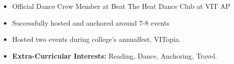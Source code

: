 \begin{itemize}
    \item Official Dance Crew Member at Beat The Heat Dance Club at VIT AP
    \item Successfully hosted and anchored around 7-8 events
    \item Hosted two events during college's annualfest, VITopia.
    \item \textbf{Extra-Curricular Interests:} Reading, Dance, Anchoring, Travel.
   
   
  
    
    
\end{itemize}
